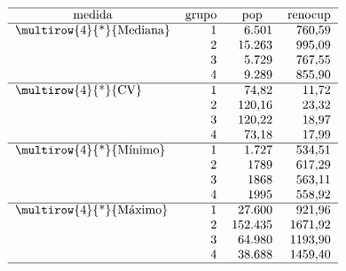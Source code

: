 \documentclass[10pt,twoside]{article}
\begin{document}
\begin{table}[!ht]
\centering
\caption{Resumo estatístico das variáveis população (pop) e rendimento médio dos ocupados (renocup) dos grupos obtidos pelo método das $k$-médias.}
\label{table1}
\[ \begin{tabular}{lrrr}
\hline
\multicolumn{1}{c}{medida} & \multicolumn{1}{c}{grupo} & \multicolumn{1}{c}{pop} & \multicolumn{1}{c}{renocup} \\ \hline
\multirow{4}{*}{Mediana}    & 1                          & 6.501                    & 760,59                      \\
                            & 2                          & 15.263                   & 995,09                      \\
                            & 3                          & 5.729                    & 767,55                      \\
                            & 4                          & 9.289                    & 855,90                      \\ \hline
\multirow{4}{*}{CV}         & 1                          & 74,82                    & 11,72                       \\
                            & 2                          & 120,16                   & 23,32                       \\
                            & 3                          & 120,22                   & 18,97                       \\
                            & 4                          & 73,18                    & 17,99                       \\ \hline
\multirow{4}{*}{Mínimo}     & 1                          & 1.727                    & 534,51                      \\
                            & 2                          & 1789                     & 617,29                      \\
                            & 3                          & 1868                     & 563,11                      \\
                            & 4                          & 1995                     & 558,92                      \\ \hline
\multirow{4}{*}{Máximo}     & 1                          & 27.600                   & 921,96                      \\
                            & 2                          & 152.435                  & 1671,92                     \\
                            & 3                          & 64.980                   & 1193,90                     \\
                            & 4                          & 38.688                   & 1459,40                     \\ \hline
\end{tabular} \]
\end{table}
\FloatBarrier
\end{document}
